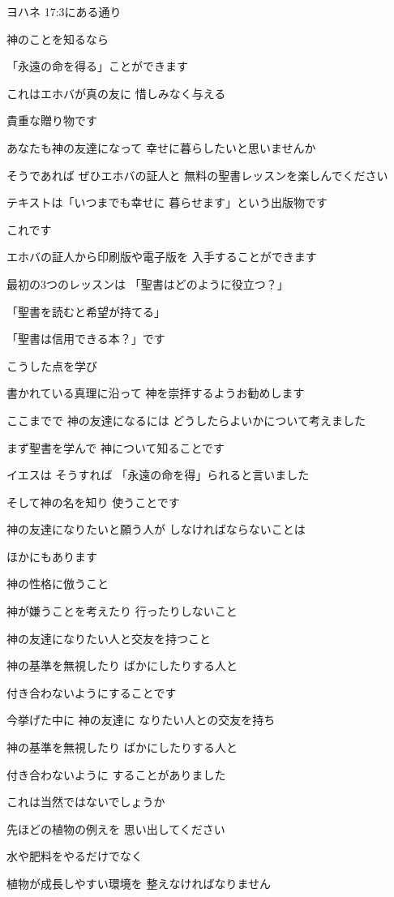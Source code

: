 \documentclass[twocolumn]{jsarticle}
\begin{document}
ヨハネ 17:3にある通り

神のことを知るなら

「永遠の命を得る」ことができます

これはエホバが真の友に
惜しみなく与える

貴重な贈り物です

あなたも神の友達になって
幸せに暮らしたいと思いませんか

そうであれば ぜひエホバの証人と
無料の聖書レッスンを楽しんでください

テキストは「いつまでも幸せに
暮らせます」という出版物です

これです

エホバの証人から印刷版や電子版を
入手することができます

最初の3つのレッスンは
「聖書はどのように役立つ？」

「聖書を読むと希望が持てる」

「聖書は信用できる本？」です

こうした点を学び

書かれている真理に沿って
神を崇拝するようお勧めします

ここまでで 神の友達になるには
どうしたらよいかについて考えました

まず聖書を学んで
神について知ることです

イエスは そうすれば
「永遠の命を得」られると言いました

そして神の名を知り 使うことです

神の友達になりたいと願う人が
しなければならないことは

ほかにもあります

神の性格に倣うこと

神が嫌うことを考えたり
行ったりしないこと

神の友達になりたい人と交友を持つこと

神の基準を無視したり
ばかにしたりする人と

付き合わないようにすることです

今挙げた中に 神の友達に
なりたい人との交友を持ち

神の基準を無視したり
ばかにしたりする人と

付き合わないように
することがありました

これは当然ではないでしょうか

先ほどの植物の例えを
思い出してください

水や肥料をやるだけでなく

植物が成長しやすい環境を
整えなければなりません
\end{document}
